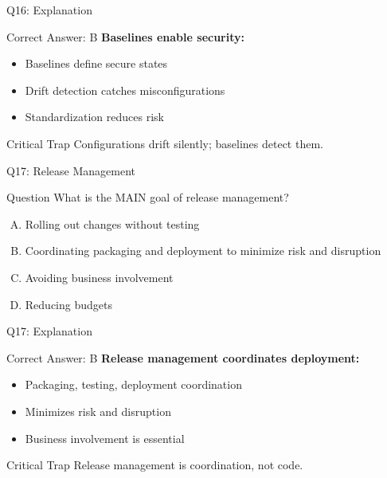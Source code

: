 \documentclass{beamer}
\begin{document}
	\begin{frame}{Q16: Explanation}
		\begin{block}{Correct Answer: B}
			\textbf{Baselines enable security:}
			\begin{itemize}
				\item Baselines define secure states
				\item Drift detection catches misconfigurations
				\item Standardization reduces risk
			\end{itemize}
		\end{block}
		\begin{alertblock}{Critical Trap}
			Configurations drift silently; baselines detect them.
		\end{alertblock}
	\end{frame}
	
	\begin{frame}{Q17: Release Management}
		\begin{block}{Question}
			What is the MAIN goal of release management?
		\end{block}
		\begin{enumerate}[(A)]
			\item Rolling out changes without testing
			\item Coordinating packaging and deployment to minimize risk and disruption
			\item Avoiding business involvement
			\item Reducing budgets
		\end{enumerate}
	\end{frame}
	
	\begin{frame}{Q17: Explanation}
		\begin{block}{Correct Answer: B}
			\textbf{Release management coordinates deployment:}
			\begin{itemize}
				\item Packaging, testing, deployment coordination
				\item Minimizes risk and disruption
				\item Business involvement is essential
			\end{itemize}
		\end{block}
		\begin{alertblock}{Critical Trap}
			Release management is coordination, not code.
		\end{alertblock}
	\end{frame}
	
\end{document}
